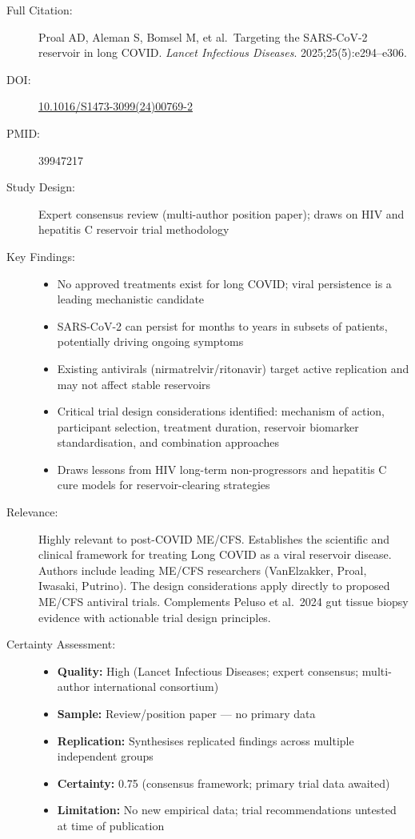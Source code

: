 \begin{description}
    \item[Full Citation:] Proal AD, Aleman S, Bomsel M, et al.\ Targeting the SARS-CoV-2 reservoir in long COVID. \textit{Lancet Infectious Diseases}. 2025;25(5):e294--e306. \cite{Proal2025Reservoir}
    \item[DOI:] \href{https://doi.org/10.1016/S1473-3099(24)00769-2}{10.1016/S1473-3099(24)00769-2}
    \item[PMID:] 39947217
    \item[Study Design:] Expert consensus review (multi-author position paper); draws on HIV and hepatitis C reservoir trial methodology
    \item[Key Findings:]
    \begin{itemize}
        \item No approved treatments exist for long COVID; viral persistence is a leading mechanistic candidate
        \item SARS-CoV-2 can persist for months to years in subsets of patients, potentially driving ongoing symptoms
        \item Existing antivirals (nirmatrelvir/ritonavir) target active replication and may not affect stable reservoirs
        \item Critical trial design considerations identified: mechanism of action, participant selection, treatment duration, reservoir biomarker standardisation, and combination approaches
        \item Draws lessons from HIV long-term non-progressors and hepatitis C cure models for reservoir-clearing strategies
    \end{itemize}
    \item[Relevance:] Highly relevant to post-COVID ME/CFS. Establishes the scientific and clinical framework for treating Long COVID as a viral reservoir disease. Authors include leading ME/CFS researchers (VanElzakker, Proal, Iwasaki, Putrino). The design considerations apply directly to proposed ME/CFS antiviral trials. Complements Peluso et al.\ 2024 gut tissue biopsy evidence with actionable trial design principles.
    \item[Certainty Assessment:]
    \begin{itemize}
        \item \textbf{Quality:} High (Lancet Infectious Diseases; expert consensus; multi-author international consortium)
        \item \textbf{Sample:} Review/position paper --- no primary data
        \item \textbf{Replication:} Synthesises replicated findings across multiple independent groups
        \item \textbf{Certainty:} 0.75 (consensus framework; primary trial data awaited)
        \item \textbf{Limitation:} No new empirical data; trial recommendations untested at time of publication
    \end{itemize}
\end{description}

